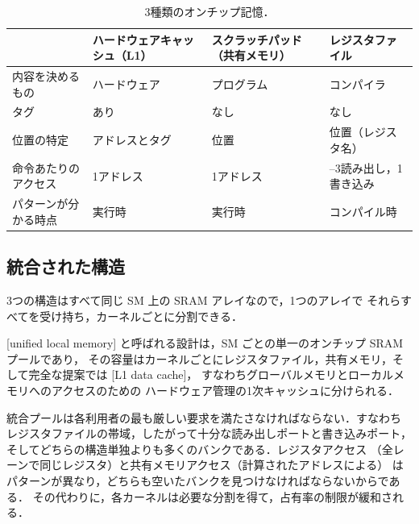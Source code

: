 \documentclass[../main.tex]{subfiles}
\begin{document}
\begin{table}[tb]
  \centering
  \caption{3種類のオンチップ記憶．}
  \label{tab:l06-storage}
  \setlength{\tabcolsep}{4pt}
  \begin{tabular}{@{}>{\raggedright\arraybackslash}p{34mm}
                  >{\raggedright\arraybackslash}p{24mm}
                  >{\raggedright\arraybackslash}p{26mm}
                  >{\raggedright\arraybackslash}p{28mm}@{}}
    \toprule
    & ハードウェアキャッシュ（L1） & スクラッチパッド（共有メモリ） & レジスタファイル \\
    \midrule
    内容を決めるもの & ハードウェア & プログラム & コンパイラ \\
    タグ & あり & なし & なし \\
    位置の特定 & アドレスとタグ & 位置 & 位置（レジスタ名） \\
    \addlinespace
    命令あたりのアクセス & 1アドレス & 1アドレス & 2--3読み出し，1書き込み \\
    パターンが分かる時点 & 実行時 & 実行時 & コンパイル時 \\
    \bottomrule
  \end{tabular}
\end{table}

\subsection{統合された構造}

3つの構造はすべて同じ SM 上の SRAM アレイなので，1つのアレイで
それらすべてを受け持ち，カーネルごとに分割できる．

\begin{definition}[統合ローカルメモリ]
  \label{def:l06-unified-local-memory}
  [unified local memory]
  と呼ばれる設計は，SM ごとの単一のオンチップ SRAM プールであり，
  その容量はカーネルごとにレジスタファイル，共有メモリ，そして完全な提案では
  [L1 data cache]，
  すなわちグローバルメモリとローカルメモリへのアクセスのための
  ハードウェア管理の1次キャッシュに分けられる．
\end{definition}

統合プールは各利用者の最も厳しい要求を満たさなければならない．すなわち
レジスタファイルの帯域，したがって十分な読み出しポートと書き込みポート，
そしてどちらの構造単独よりも多くのバンクである．レジスタアクセス
（全レーンで同じレジスタ）と共有メモリアクセス（計算されたアドレスによる）
はパターンが異なり，どちらも空いたバンクを見つけなければならないからである．
その代わりに，各カーネルは必要な分割を得て，占有率の制限が緩和される．
\end{document}
